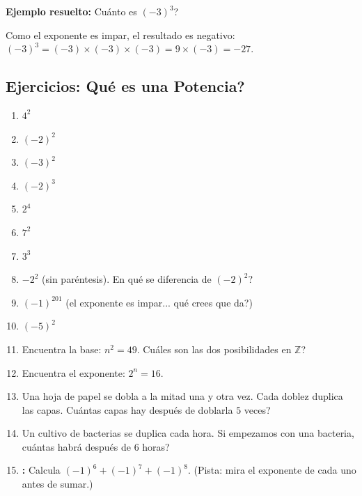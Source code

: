 \documentclass[12pt, letterpaper]{article}
\newcommand{\Z}{\mathbb{Z}}
\begin{document}
\noindent\textbf{Ejemplo resuelto:} \textquestiondown Cuánto es $(-3)^3$?

Como el exponente es impar, el resultado es negativo: $(-3)^3 = (-3) \times (-3) \times (-3) = 9 \times (-3) = -27$.

\subsection{Ejercicios: \textquestiondown Qué es una Potencia?}

\begin{enumerate}[leftmargin=*, start=1]
  \item \facil{} $4^2$

  \item \medio{} $(-2)^2$

  \item \medio{} $(-3)^2$

  \item \medio{} $(-2)^3$

  \item \medio{} $2^4$

  \item \medio{} $7^2$

  \item \medio{} $3^3$

  \item \medio{} $-2^2$ (sin paréntesis). \textquestiondown En qué se diferencia de $(-2)^2$?

  \item \medio{} $(-1)^{201}$ (el exponente es impar... \textquestiondown qué crees que da?)

  \item \medio{} $(-5)^2$

  \item \dificil{} Encuentra la base: $n^2 = 49$. \textquestiondown Cuáles son las dos posibilidades en $\Z$?

  \item \dificil{} Encuentra el exponente: $2^n = 16$.

  \item \dificil{} Una hoja de papel se dobla a la mitad una y otra vez. Cada doblez duplica las capas. \textquestiondown Cuántas capas hay después de doblarla $5$ veces?

  \item \dificil{} Un cultivo de bacterias se duplica cada hora. Si empezamos con una bacteria, \textquestiondown cuántas habrá después de $6$ horas?

  \item \dificil{} \textbf{:} Calcula $(-1)^6 + (-1)^7 + (-1)^8$. (Pista: mira el exponente de cada uno antes de sumar.)
\end{enumerate}
\end{document}

